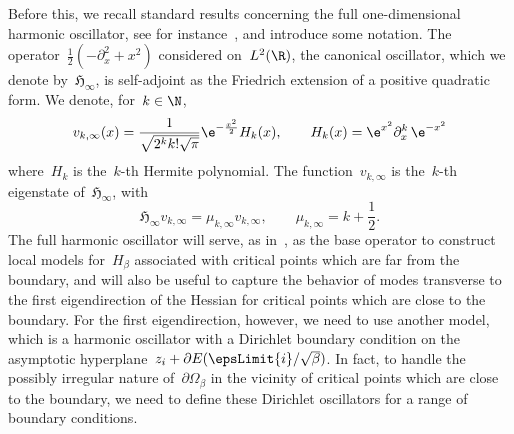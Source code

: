     Before this, we recall standard results concerning the full one-dimensional harmonic oscillator, see for instance~\cite{T14}, and introduce some notation.
    The operator~$\frac12\left(-\partial_x^2+x^2\right)$ considered on~$L^2(\R)$, the canonical oscillator, which we denote by~${\mathfrak H}_{\infty}$, is self-adjoint as the Friedrich extension of a positive quadratic form.
    We denote, for~$k\in\N$,
    \begin{equation}
        \label{02:eq:hermite_eigenfunction}
        v_{k,\infty}(x) = \frac{1}{\sqrt{2^k k! \sqrt\pi}}\e^{-\frac{x^2}2}H_k(x),\qquad H_k(x) = \e^{x^2}\partial_x^k\,\e^{-x^2}
    \end{equation}
    where~$H_k$ is the~$k$-th Hermite polynomial. The function~$v_{k,\infty}$ is the~$k$-th eigenstate of~${\mathfrak H}_\infty$, with
    \begin{equation}
        \label{02:eq:hermite_eigenproblem}
         \mathfrak{H}_{\infty}v_{k,\infty} = \mu_{k,\infty} v_{k,\infty},\qquad \mu_{k,\infty} = k + \frac12.
    \end{equation}
    The full harmonic oscillator will serve, as in~\cite[Chapter 11]{CFKS87}, as the base operator to construct local models for~$H_\beta$ associated with critical points which are far from the boundary, and will also be useful to capture the behavior of modes transverse to the first eigendirection of the Hessian for critical points which are close to the boundary.
    For the first eigendirection, however, we need to use another model, which is a harmonic oscillator with a Dirichlet boundary condition on the asymptotic hyperplane~$z_i+\partial E(\epsLimit{i}/\sqrt\beta)$.
    In fact, to handle the possibly irregular nature of~$\partial\Omega_\beta$ in the vicinity of critical points which are close to the boundary, we need to define these Dirichlet oscillators for a range of boundary conditions.

